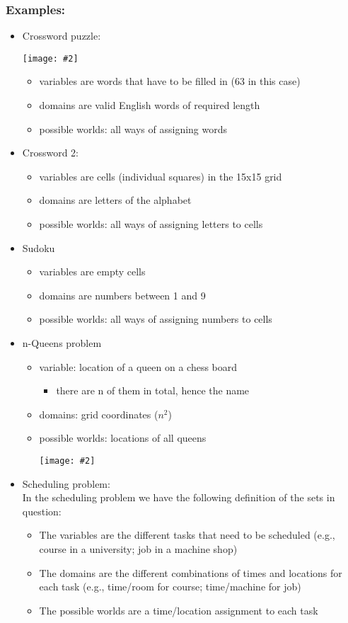 \documentclass{article}
\def\blu#1{{\color{blu}#1}}
\theoremstyle{definition}
\newcommand{\centerfig}[2]{\begin{center}\texttt{[image: \#2]}\end{center}}
\begin{document}
\subsubsection*{Examples:}
\begin{itemize}[label=$ \rightarrow $]
	\item Crossword puzzle:
	\centerfig{0.5}{crossword}
	\begin{itemize}
		\item variables are words that have to be filled in (63 in this case)
		\item domains are valid English words of required length
		\item possible worlds: all ways of assigning words
	\end{itemize}
\item Crossword 2:
\begin{itemize}
	\item variables are cells (individual squares) in the 15x15 grid
\item domains are letters of the alphabet
\item possible worlds: all ways of assigning letters to cells
\end{itemize}
\item Sudoku
\begin{itemize}
	\item variables are empty cells
	\item domains are numbers between 1 and 9
	\item possible worlds: all ways of assigning numbers to cells
\end{itemize}
\item n-Queens problem
\begin{itemize}
	\item variable: location of a queen on a chess board
	\begin{itemize}
		\item there are n of them in total, hence the name
	\end{itemize} 
	\item domains: grid coordinates ($ n^2 $)
	\item possible worlds: locations of all queens
	\centerfig{0.25}{queens}
	
\end{itemize}



\item Scheduling problem: \\
In the scheduling problem we have the following definition of the sets in question:
\begin{itemize}
	\item The \blu{variables} are the different tasks that need to be scheduled (e.g., course in a university; job in a machine shop)
	\item The \blu{domains} are the different combinations of times and locations for each task (e.g., time/room for course; time/machine for job)
	\item The \blu{possible worlds} are a time/location assignment to each task
\end{itemize}
\end{itemize}
\endgroup
\end{document}
